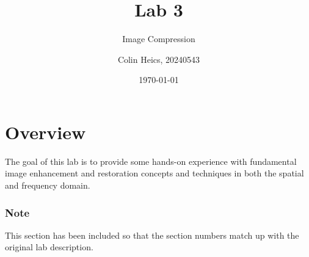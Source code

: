 \documentclass[article, 1.5space, letterpaper, 12pt, oneside, header, footer]{SydeClass}
\title{Lab 3}
\subtitle{Image Compression}
\author{Colin Heics, 20240543}
\date{\today}
\begin{document}




\section{Overview}
The goal of this lab is to provide some hands-on experience with fundamental image enhancement and restoration concepts and techniques in both the spatial and frequency domain.

\subsubsection{Note}
This section has been included so that the section numbers match up with the original lab description.


















\end{document}
